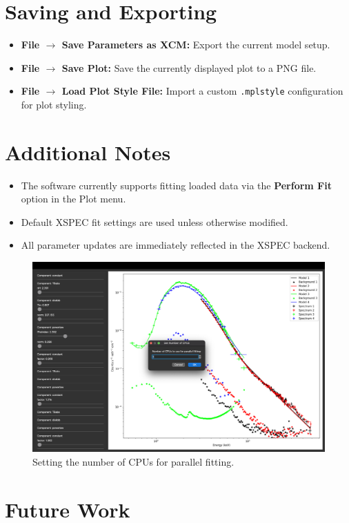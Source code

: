 \documentclass[11pt]{article}
\begin{document}
\section*{Saving and Exporting}

\begin{itemize}
    \item \textbf{File $\rightarrow$ Save Parameters as XCM:} Export the current model setup.
    \item \textbf{File $\rightarrow$ Save Plot:} Save the currently displayed plot to a PNG file.
    \item \textbf{File $\rightarrow$ Load Plot Style File:} Import a custom \texttt{.mplstyle} configuration for plot styling.
\end{itemize}

\section*{Additional Notes}

\begin{itemize}
    \item The software currently supports fitting loaded data via the \textbf{Perform Fit} option in the Plot menu.
    \item Default XSPEC fit settings are used unless otherwise modified.
    \item All parameter updates are immediately reflected in the XSPEC backend.
\end{itemize}

\begin{figure}[H]
    \centering
    \includegraphics[width=0.7\linewidth]{documentation_images/set_number_of_cpus_for_parallel_fitting.png}
    \caption{Setting the number of CPUs for parallel fitting.}
\end{figure}

\section*{Future Work}
\end{document}
